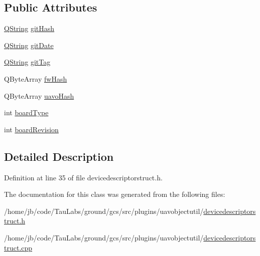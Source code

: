 \subsection*{\-Public \-Attributes}
\begin{DoxyCompactItemize}
\item 
\hyperlink{group___u_a_v_objects_plugin_gab9d252f49c333c94a72f97ce3105a32d}{\-Q\-String} \hyperlink{group___u_a_v_object_util_plugin_ga7c265729bc1bc959e63a3c8f0f1543e8}{git\-Hash}
\item 
\hyperlink{group___u_a_v_objects_plugin_gab9d252f49c333c94a72f97ce3105a32d}{\-Q\-String} \hyperlink{group___u_a_v_object_util_plugin_gaf7688dd9b2d5fe676da57bbca33e460d}{git\-Date}
\item 
\hyperlink{group___u_a_v_objects_plugin_gab9d252f49c333c94a72f97ce3105a32d}{\-Q\-String} \hyperlink{group___u_a_v_object_util_plugin_ga69f44ea76d04a61aac18e4393eba4e84}{git\-Tag}
\item 
\-Q\-Byte\-Array \hyperlink{group___u_a_v_object_util_plugin_ga95764afe0cb2f53538af8c885eed80aa}{fw\-Hash}
\item 
\-Q\-Byte\-Array \hyperlink{group___u_a_v_object_util_plugin_gaa4639a6c66d44d1f5e0bf6c22c5eec64}{uavo\-Hash}
\item 
int \hyperlink{group___u_a_v_object_util_plugin_gaca2d8de7c741004f32a16a6d69f6b377}{board\-Type}
\item 
int \hyperlink{group___u_a_v_object_util_plugin_ga14b177e8d629710371658edd0acc7b3a}{board\-Revision}
\end{DoxyCompactItemize}


\subsection{\-Detailed \-Description}


\-Definition at line 35 of file devicedescriptorstruct.\-h.



\-The documentation for this class was generated from the following files\-:\begin{DoxyCompactItemize}
\item 
/home/jb/code/\-Tau\-Labs/ground/gcs/src/plugins/uavobjectutil/\hyperlink{devicedescriptorstruct_8h}{devicedescriptorstruct.\-h}\item 
/home/jb/code/\-Tau\-Labs/ground/gcs/src/plugins/uavobjectutil/\hyperlink{devicedescriptorstruct_8cpp}{devicedescriptorstruct.\-cpp}\end{DoxyCompactItemize}

